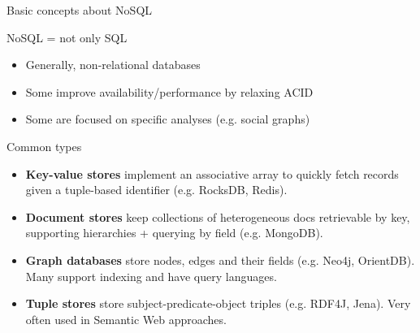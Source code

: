\documentclass[10pt]{beamer}
\begin{document}
\begin{frame}{Basic concepts about NoSQL}

\begin{block}{NoSQL = not only SQL}
  \begin{itemize}
  \item Generally, non-relational databases
  \item Some improve availability/performance by relaxing ACID
  \item Some are focused on specific analyses (e.g. social graphs)
  \end{itemize}
\end{block}

\begin{block}{Common types}
\begin{itemize}
\item \textbf{Key-value stores} implement an associative array to quickly fetch
  records given a tuple-based identifier (e.g. RocksDB, Redis).

\item \textbf{Document stores} keep collections of heterogeneous docs
  retrievable by key, supporting hierarchies + querying by field (e.g. MongoDB).

\item \textbf{Graph databases} store nodes, edges and their fields (e.g. Neo4j,
  OrientDB). Many support indexing and have query languages.

\item \textbf{Tuple stores} store subject-predicate-object triples (e.g. RDF4J,
  Jena). Very often used in Semantic Web approaches.
\end{itemize}
\end{block}

\end{frame}
\end{document}
